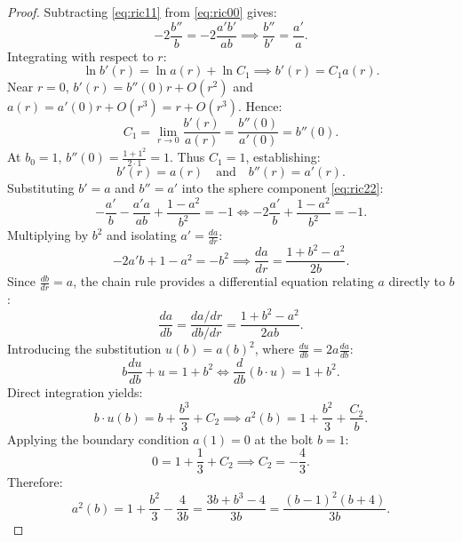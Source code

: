 \documentclass[12pt]{article}
\begin{document}
\begin{proof}
Subtracting \eqref{eq:ric11} from \eqref{eq:ric00} gives:
\begin{equation}
-2\frac{b''}{b} = -2\frac{a'b'}{ab} \implies \frac{b''}{b'} = \frac{a'}{a}.
\end{equation}
Integrating with respect to $r$:
\begin{equation}
\ln b'(r) = \ln a(r) + \ln C_1 \implies b'(r) = C_1 a(r).
\end{equation}
Near $r = 0$, $b'(r) = b''(0) r + O(r^2)$ and $a(r) = a'(0) r + O(r^3) = r + O(r^3)$. Hence:
\begin{equation}
C_1 = \lim_{r \to 0} \frac{b'(r)}{a(r)} = \frac{b''(0)}{a'(0)} = b''(0).
\end{equation}
At $b_0 = 1$, $b''(0) = \frac{1 + 1^2}{2 \cdot 1} = 1$. Thus $C_1 = 1$, establishing:
\begin{equation}
b'(r) = a(r) \quad \text{and} \quad b''(r) = a'(r).
\end{equation}
Substituting $b' = a$ and $b'' = a'$ into the sphere component \eqref{eq:ric22}:
\begin{equation}
-\frac{a'}{b} - \frac{a' a}{ab} + \frac{1 - a^2}{b^2} = -1 \iff -2\frac{a'}{b} + \frac{1 - a^2}{b^2} = -1.
\end{equation}
Multiplying by $b^2$ and isolating $a' = \frac{da}{dr}$:
\begin{equation}
-2a'b + 1 - a^2 = -b^2 \implies \frac{da}{dr} = \frac{1 + b^2 - a^2}{2b}.
\end{equation}
Since $\frac{db}{dr} = a$, the chain rule provides a differential equation relating $a$ directly to $b$:
\begin{equation}
\frac{da}{db} = \frac{da/dr}{db/dr} = \frac{1 + b^2 - a^2}{2ab}.
\end{equation}
Introducing the substitution $u(b) = a(b)^2$, where $\frac{du}{db} = 2a \frac{da}{db}$:
\begin{equation}
b \frac{du}{db} + u = 1 + b^2 \iff \frac{d}{db}(b \cdot u) = 1 + b^2.
\end{equation}
Direct integration yields:
\begin{equation}
b \cdot u(b) = b + \frac{b^3}{3} + C_2 \implies a^2(b) = 1 + \frac{b^2}{3} + \frac{C_2}{b}.
\end{equation}
Applying the boundary condition $a(1) = 0$ at the bolt $b = 1$:
\begin{equation}
0 = 1 + \frac{1}{3} + C_2 \implies C_2 = -\frac{4}{3}.
\end{equation}
Therefore:
\begin{equation}
a^2(b) = 1 + \frac{b^2}{3} - \frac{4}{3b} = \frac{3b + b^3 - 4}{3b} = \frac{(b - 1)^2(b + 4)}{3b}.
\end{equation}
\end{proof}
\end{document}
